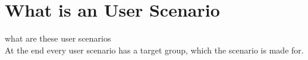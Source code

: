 \section{What is an User Scenario}
what are these user scenarios
\\
At the end every user scenario has a target group, which the scenario is made for.
